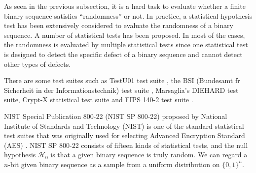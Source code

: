 As seen in the previous subsection, it is a hard task to evaluate whether a finite binary sequence satisfies ``randomness'' or not. In practice, a statistical hypothesis test has been extensively considered to evaluate the randomness of a binary sequence. A number of statistical tests has been proposed. In most of the cases, the randomness is evaluated by multiple statistical tests since one statistical test is designed to detect the specific defect of a binary sequence and cannot detect other types of defects.
%
%
%
\par
There are some test suites such as TestU01 test suite \cite{l2007testu01}, the BSI (Bundesamt fr Sicherheit in der Informationstechnik) test suite \cite{schindler1999functionality,killmann2001proposal}, Marsaglia's DIEHARD test suite, Crypt-X statistical test suite \cite{caelli1992crypt} and FIPS 140-2 test suite \cite{fips2001140}.
\par
%
NIST Special Publication 800-22 (NIST SP 800-22) \cite{rukhin2001statistical,bassham2010sp} proposed by National Institute of Standards and Technology (NIST) is one of the standard statistical test suites that was originally used for selecting Advanced Encryption Standard (AES) \cite{rijmen2001advanced}. 
%
NIST SP 800-22 consists of fifteen kinds of statistical tests, and the null hypothesis $\mathcal{H}_0$ is that a given binary sequence is truly random. We can regard a $n$-bit given binary sequence as a sample from a uniform distribution on $\{0,1\}^n$.
